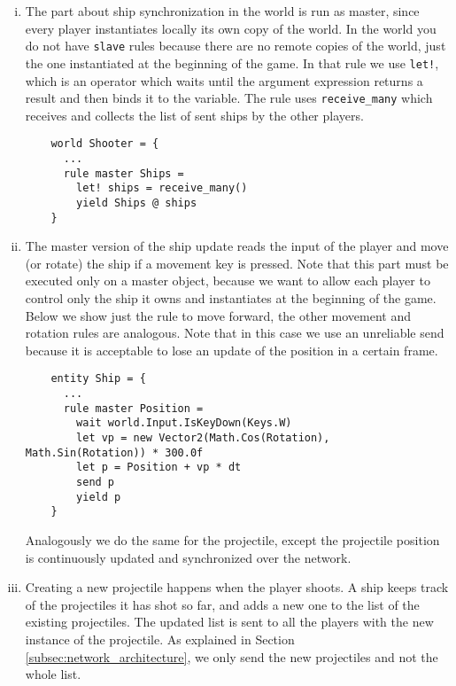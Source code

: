 \begin{enumerate}[(i)]
	\item The part about ship synchronization in the world is run as master, since every player instantiates locally its own copy of the world. In the world you do not have \texttt{slave} rules because there are no remote copies of the world, just the one instantiated at the beginning of the game. In that rule we use \texttt{let!}, which is an operator which waits until the argument expression returns a result and then binds it to the variable. The rule uses \texttt{receive\_many} which receives and collects the list of sent ships by the other players.
	
	\begin{lstlisting}
	world Shooter = {
	  ...
	  rule master Ships =
	    let! ships = receive_many()
	    yield Ships @ ships
    }
	\end{lstlisting}
	
	\item The master version of the ship update reads the input of the player and move (or rotate) the ship if a movement key is pressed. Note that this part must be executed only on a master object, because we want to allow each player to control only the ship it owns and instantiates at the beginning of the game. Below we show just the rule to move forward, the other movement and rotation rules are analogous. Note that in this case we use an unreliable send because it is acceptable to lose an update of the position in a certain frame.
	
	\begin{lstlisting}
	entity Ship = {
	  ...
	  rule master Position =
	    wait world.Input.IsKeyDown(Keys.W)
	    let vp = new Vector2(Math.Cos(Rotation), Math.Sin(Rotation)) * 300.0f
	    let p = Position + vp * dt
	    send p
	    yield p
	}
	\end{lstlisting}
	
	Analogously we do the same for the projectile, except the projectile position is continuously updated and synchronized over the network.
	
	\item Creating a new projectile happens when the player shoots. A ship keeps track of the projectiles it has shot so far, and adds a new one to the list of the existing projectiles. The updated list is sent to all the players with the new instance of the projectile. As explained in Section \ref{subsec:network_architecture}, we only send the new projectiles and not the whole list.
	

\end{enumerate}
